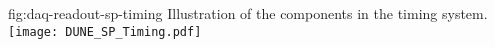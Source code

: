 \begin{dunefigure}{fig:daq-readout-sp-timing}
  {Illustration of the components in the \single timing system.}
  \texttt{[image: DUNE\_SP\_Timing.pdf]}
\end{dunefigure}


